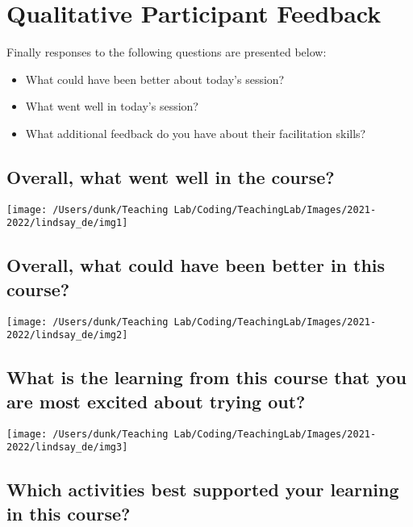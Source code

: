 \documentclass[10,a4paperpaper,]{article}
\begin{document}
\section{Qualitative Participant Feedback}

Finally responses to the following questions are presented below:

\begin{itemize}
\item
  What could have been better about today's session?
\item
  What went well in today's session?
\item
  What additional feedback do you have about their facilitation skills?
\end{itemize}

\subsection{Overall, what went well in the course?}

\begin{center}\texttt{[image: /Users/dunk/Teaching Lab/Coding/TeachingLab/Images/2021-2022/lindsay\_de/img1]} \end{center}

\subsection{Overall, what could have been better in this course?}

\begin{center}\texttt{[image: /Users/dunk/Teaching Lab/Coding/TeachingLab/Images/2021-2022/lindsay\_de/img2]} \end{center}

\subsection{What is the learning from this course that you are most excited about trying out?}

\begin{center}\texttt{[image: /Users/dunk/Teaching Lab/Coding/TeachingLab/Images/2021-2022/lindsay\_de/img3]} \end{center}

\subsection{Which activities best supported your learning in this course?}
\end{document}
